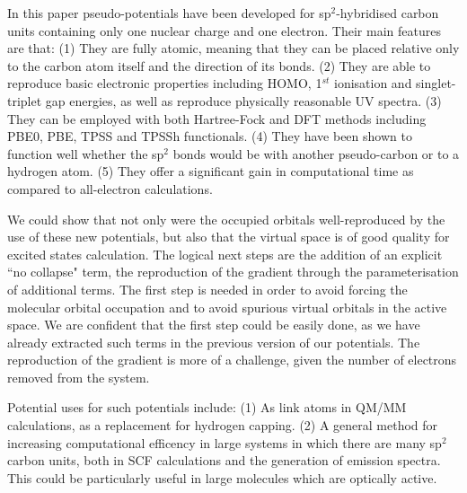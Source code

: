 \documentclass[12pt]{article}
\begin{document}
In this paper pseudo-potentials have been developed for sp$^{2}$-hybridised carbon units containing only one nuclear charge and one electron. Their main features are that: (1) They are fully atomic, meaning that they can be placed relative only to the carbon atom itself and the direction of its bonds. (2) They are able to reproduce basic electronic properties including HOMO, 1$^{st}$ ionisation and singlet-triplet gap energies, as well as reproduce physically reasonable UV spectra. (3) They can be employed with both Hartree-Fock and DFT methods including PBE0, PBE, TPSS and TPSSh functionals. (4) They have been shown to function well whether the sp$^{2}$ bonds would be with another pseudo-carbon or to a hydrogen atom. (5) They offer a significant gain in computational time as compared to all-electron calculations.

We could show that not only were the occupied orbitals well-reproduced by the use of these new potentials, but also that the virtual space is of good quality
for excited states calculation. The logical next steps are the addition of an explicit ``no collapse" term, the reproduction of the gradient through the parameterisation of additional terms. The first step is needed in order to avoid forcing the molecular orbital occupation and to avoid spurious virtual orbitals in the active space. We are confident that the first step could be easily done, as we have already extracted such terms in the previous version of our potentials. The reproduction of the gradient is more of a challenge, given the number of electrons removed from the system.

Potential uses for such potentials include: (1) As link atoms in QM/MM calculations, as a replacement for hydrogen capping. (2) A general method for increasing computational efficency in large systems in which there are many sp$^{2}$ carbon units, both in SCF calculations and the generation of emission spectra. This could be particularly useful in large molecules which are optically active.

\clearpage



%
%
\end{document}
